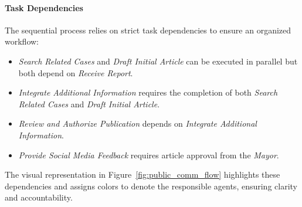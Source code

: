 \paragraph{Task Dependencies}
The sequential process relies on strict task dependencies to ensure an organized workflow:
\begin{itemize}
	\item \textit{Search Related Cases} and \textit{Draft Initial Article} can be executed in parallel but both depend on \textit{Receive Report}.
	\item \textit{Integrate Additional Information} requires the completion of both \textit{Search Related Cases} and \textit{Draft Initial Article}.
	\item \textit{Review and Authorize Publication} depends on \textit{Integrate Additional Information}.
	\item \textit{Provide Social Media Feedback} requires article approval from the \textit{Mayor}.
\end{itemize}

The visual representation in Figure~\ref{fig:public_comm_flow} highlights these dependencies and assigns colors to denote the responsible agents, ensuring clarity and accountability.
